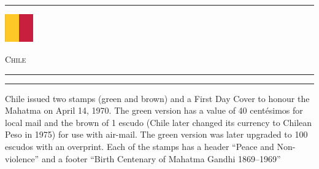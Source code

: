 \documentclass[a4paper]{article}
\begin{document}
\hrule
\vspace{8pt}
\begin{minipage}{2cm}
  \includegraphics[height=1.2cm]{images/td}
\end{minipage}
\hfill
{\scshape\huge Chile}
\vspace{8pt}
\hrule
\vspace{14cm}
\begin{center}
\begin{minipage}{10cm}
  \hrule \vspace{12pt} Chile issued two stamps (green and brown) and a
  First Day Cover to honour the Mahatma on April 14, 1970. The green
  version has a value of 40 cent\'{e}simos for local mail and the
  brown of 1 escudo (Chile later changed its currency to Chilean Peso
  in 1975) for use with air-mail. The green version was later upgraded
  to 100 escudos with an overprint. Each of the stamps has a header
  ``Peace and Non-violence'' and a footer ``Birth Centenary of Mahatma
  Gandhi 1869--1969''
\end{minipage}
\end{center}
\end{document}

